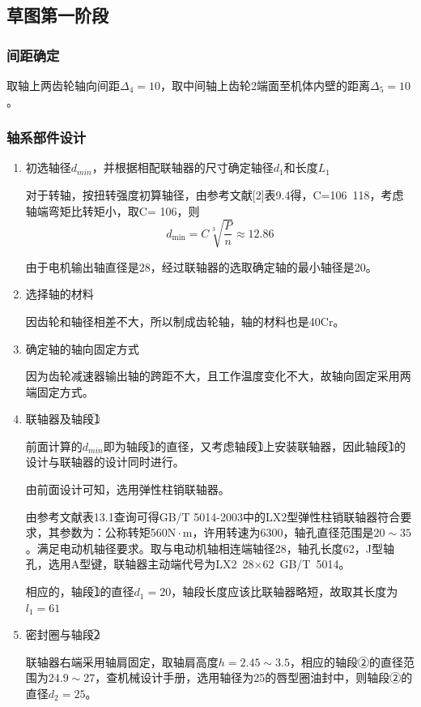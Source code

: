 \subsection{草图第一阶段}
\subsubsection{间距确定}
取\uppercase\expandafter{}轴上两齿轮轴向间距$\Delta_4=10$，取中间轴上齿轮2端面至机体内壁的距离$\Delta_5=10$。
\subsubsection{\uppercase\expandafter{}轴系部件设计}
\begin{enumerate}[i]
	\item 初选轴径$d_{min}$，并根据相配联轴器的尺寸确定轴径$d_1$和长度$L_1$
	\par 对于转轴，按扭转强度初算轴径，由参考文献[2]表9.4得，C=106~118，考虑轴端弯矩比转矩小，取C= 106，则$$d_{\min}=C\sqrt[3]{\frac{P}{n}}\approx 12.86$$
	\par 由于电机输出轴直径是28，经过联轴器的选取确定\uppercase\expandafter{}轴的最小轴径是20。
	
	\item 选择轴的材料
	\par 因齿轮和轴径相差不大，所以制成齿轮轴，轴的材料也是40Cr。
	
	\item 确定轴的轴向固定方式
	\par 因为齿轮减速器输出轴的跨距不大，且工作温度变化不大，故轴向固定采用两端固定方式。
	
	\item 联轴器及轴段\textcircled{1}
	\par 前面计算的$d_{min}$即为轴段\textcircled{1}的直径，又考虑轴段\textcircled{1}上安装联轴器，因此轴段\textcircled{1}的设计与联轴器的设计同时进行。
	\par 由前面设计可知，选用弹性柱销联轴器。	
	\par 由参考文献\cite{1}表13.1查询可得GB/T 5014-2003中的LX2型弹性柱销联轴器符合要求，其参数为：公称转矩560$\mathrm{N}\cdot \mathrm{m}$，许用转速为6300，轴孔直径范围是$20\sim 35$。满足电动机轴径要求。取与电动机轴相连端轴径28，轴孔长度62，J型轴孔，选用A型键，联轴器主动端代号为LX2~28×62~GB/T~5014。
	\par 相应的，轴段\textcircled{1}的直径$d_1=20$，轴段长度应该比联轴器略短，故取其长度为$l_1=61$
	
	\item 密封圈与轴段\textcircled{2}
	\par 联轴器右端采用轴肩固定，取轴肩高度$h=2.45\sim 3.5$，相应的轴段②的直径范围为$24.9\sim 27$，查机械设计手册，选用轴径为25的唇型圈油封中，则轴段②的直径$d_2=25$。
	

\end{enumerate}
